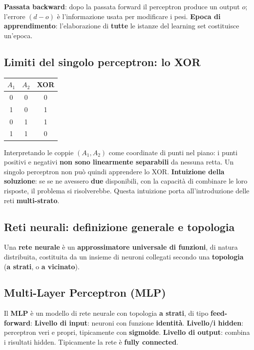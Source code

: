 \documentclass[11pt,a4paper]{report}
\begin{document}
\textbf{Passata backward}: dopo la passata forward il perceptron produce un output $o$; l'errore $(d-o)$ è l'informazione usata per modificare i pesi. \textbf{Epoca di apprendimento}: l'elaborazione di \textbf{tutte} le istanze del learning set costituisce un'epoca.

\subsection*{Limiti del singolo perceptron: lo XOR}

\begin{center}
\begin{tabular}{@{}ccc@{}}
\toprule
$A_1$ & $A_2$ & XOR \\
\midrule
0 & 0 & 0 \\
1 & 0 & 1 \\
0 & 1 & 1 \\
1 & 1 & 0 \\
\bottomrule
\end{tabular}
\end{center}

Interpretando le coppie $(A_1,A_2)$ come coordinate di punti nel piano: i punti positivi e negativi \textbf{non sono linearmente separabili} da nessuna retta. Un singolo perceptron non può quindi apprendere lo XOR. \textbf{Intuizione della soluzione}: se se ne avessero \textbf{due} disponibili, con la capacità di combinare le loro risposte, il problema si risolverebbe. Questa intuizione porta all'introduzione delle reti \textbf{multi-strato}.

\subsection*{Reti neurali: definizione generale e topologia}

Una \textbf{rete neurale} è un \textbf{approssimatore universale di funzioni}, di natura distribuita, costituita da un insieme di neuroni collegati secondo una \textbf{topologia} (\textbf{a strati}, o \textbf{a vicinato}).

\subsection*{Multi-Layer Perceptron (MLP)}

Il \textbf{MLP} è un modello di rete neurale con topologia \textbf{a strati}, di tipo \textbf{feed-forward}: \textbf{Livello di input}: neuroni con funzione \textbf{identità}. \textbf{Livello/i hidden}: perceptron veri e propri, tipicamente con \textbf{sigmoide}. \textbf{Livello di output}: combina i risultati hidden. Tipicamente la rete è \textbf{fully connected}.
\end{document}
